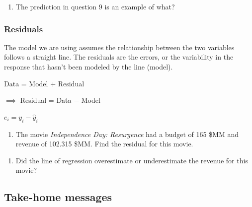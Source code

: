 \documentclass[
]{report}
\providecommand{\tightlist}{%
  \setlength{\itemsep}{0pt}\setlength{\parskip}{0pt}}
\begin{document}
\begin{enumerate}
\def\labelenumi{\arabic{enumi}.}
\setcounter{enumi}{9}
\tightlist
\item
  The prediction in question 9 is an example of what?
\end{enumerate}

\vspace{0.3in}

\hypertarget{residuals}{%
\subsubsection*{Residuals}\label{residuals}}

The model we are using assumes the relationship between the two variables follows a straight line. The residuals are the errors, or the variability in the response that hasn't been modeled by the line (model).

\begin{center}
Data = Model + Residual

$\implies$ Residual = Data $-$ Model

$e_i=y_i-\hat{y}_i$
\end{center}

\begin{enumerate}
\def\labelenumi{\arabic{enumi}.}
\setcounter{enumi}{10}
\tightlist
\item
  The movie \emph{Independence Day: Resurgence} had a budget of 165 \$MM and revenue of 102.315 \$MM. Find the residual for this movie.
\end{enumerate}

\vspace{.8in}

\begin{enumerate}
\def\labelenumi{\arabic{enumi}.}
\setcounter{enumi}{11}
\tightlist
\item
  Did the line of regression overestimate or underestimate the revenue for this movie?
\end{enumerate}

\vspace{.2in}

\hypertarget{take-home-messages-6}{%
\subsection{Take-home messages}\label{take-home-messages-6}}
\end{document}
